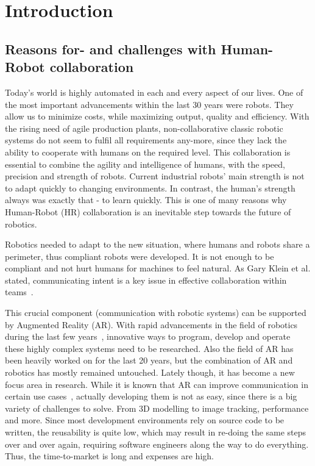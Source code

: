 \chapter{Introduction}\label{Chap:Introduction}

\section{Reasons for- and challenges with Human-Robot collaboration}\label{Section:ProblemDescription}
Today's world is highly automated in each and every aspect of our lives. One of the most important advancements within the last 30 years were robots. They allow us to minimize costs, while maximizing output, quality and efficiency. With the rising need of agile production plants, non-collaborative classic robotic systems do not seem to fulfil all requirements any-more, since they lack the ability to cooperate with humans on the required level. This collaboration is essential to combine the agility and intelligence of humans, with the speed, precision and strength of robots. Current industrial robots' main strength is not to adapt quickly to changing environments. In contrast, the human's strength always was exactly that - to learn quickly. This is one of many reasons why Human-Robot (HR) collaboration is an inevitable step towards the future of robotics.

Robotics needed to adapt to the new situation, where humans and robots share a perimeter, thus compliant robots were developed. It is not enough to be compliant and not hurt humans for machines to feel natural. As Gary Klein et al. stated, communicating intent is a key issue in effective collaboration within teams~\cite{klein2005common}. 

This crucial component (communication with robotic systems) can be supported by Augmented Reality (AR). With rapid advancements in the field of robotics during the last few years~\cite{laschi2016soft}, innovative ways to program, develop and operate these highly complex systems need to be researched. Also the field of AR has been heavily worked on for the last 20 years, but the combination of AR and robotics has mostly remained untouched. Lately though, it has become a new focus area in research. While it is known that AR can improve communication in certain use cases~\cite{ARCommunicationBenefits}, actually developing them is not as easy, since there is a big variety of challenges to solve. From 3D modelling to image tracking, performance and more. Since most development environments rely on source code to be written, the reusability is quite low, which may result in re-doing the same steps over and over again, requiring software engineers along the way to do everything. Thus, the time-to-market is long and expenses are high.

